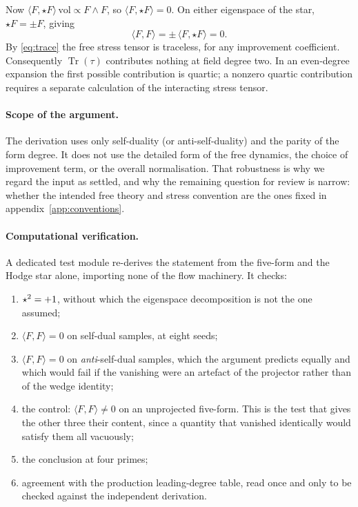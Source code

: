 Now $\langle F, \star F\rangle\,\mathrm{vol} \propto F \wedge F$, so
$\langle F, \star F\rangle = 0$. On either eigenspace of the star,
$\star F = \pm F$, giving
\begin{equation}
\langle F, F \rangle
 = \pm\,\langle F, \star F\rangle
 = 0 .
\end{equation}
By \eqref{eq:trace} the free stress tensor is traceless, for any improvement
coefficient. Consequently $\operatorname{Tr}(\tau)$ contributes nothing at field
degree two. In an even-degree expansion the first possible contribution is
quartic; a nonzero quartic contribution requires a separate calculation of the
interacting stress tensor.

\paragraph{Scope of the argument.}
The derivation uses only self-duality (or anti-self-duality) and the parity of
the form degree. It does not use the detailed form of the free dynamics, the
choice of improvement term, or the overall normalisation. That robustness is why
we regard the input as settled, and why the remaining question for review is
narrow: whether the intended free theory and stress convention are the ones fixed
in appendix~\ref{app:conventions}.

\paragraph{Computational verification.}
A dedicated test module re-derives the statement from the five-form and the
Hodge star alone, importing none of the flow machinery. It checks:
\begin{enumerate}\itemsep2pt
\item $\star^2 = +1$, without which the eigenspace decomposition is
      not the one assumed;
\item $\langle F,F\rangle = 0$ on self-dual samples, at eight seeds;
\item $\langle F,F\rangle = 0$ on \emph{anti}-self-dual samples, which the
      argument predicts equally and which would fail if the vanishing were an
      artefact of the projector rather than of the wedge identity;
\item the control: $\langle F,F\rangle \neq 0$ on an unprojected five-form. This
      is the test that gives the other three their content, since a quantity that
      vanished identically would satisfy them all vacuously;
\item the conclusion at four primes;
\item agreement with the production leading-degree table, read once and only to
      be checked against the independent derivation.
\end{enumerate}

